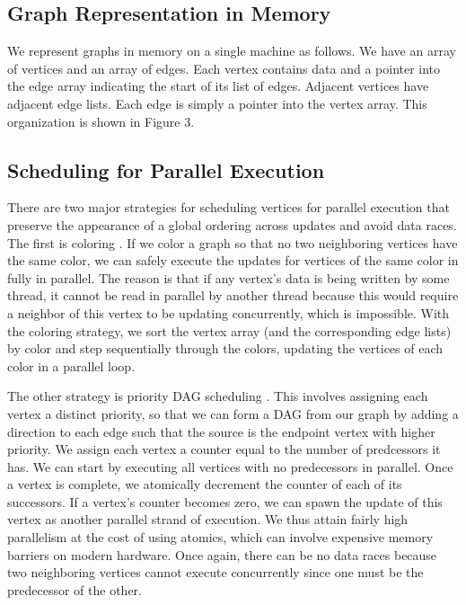 \subsection{Graph Representation in Memory}
We represent graphs in memory on a single machine as follows. We have an array of vertices and an array of edges. Each vertex contains data and a pointer into the edge array indicating the start of its list of edges. Adjacent vertices have adjacent edge lists. Each edge is simply a pointer into the vertex array. This organization is shown in Figure 3.

\subsection{Scheduling for Parallel Execution}
There are two major strategies for scheduling vertices for parallel execution that preserve the appearance of a global ordering across updates and avoid data races. The first is coloring \cite{KalerHaSc14}. If we color a graph so that no two neighboring vertices have the same color, we can safely execute the updates for vertices of the same color in fully in parallel. The reason is that if any vertex's data is being written by some thread, it cannot be read in parallel by another thread because this would require a neighbor of this vertex to be updating concurrently, which is impossible. With the coloring strategy, we sort the vertex array (and the corresponding edge lists) by color and step sequentially through the colors, updating the vertices of each color in a parallel loop.

The other strategy is priority DAG scheduling \cite{JonesPl93}. This involves assigning each vertex a distinct priority, so that we can form a DAG from our graph by adding a direction to each edge such that the source is the endpoint vertex with higher priority. We assign each vertex a counter equal to the number of predcessors it has. We can start by executing all vertices with no predecessors in parallel. Once a vertex is complete, we atomically decrement the counter of each of its successors. If a vertex's counter becomes zero, we can spawn the update of this vertex as another parallel strand of execution. We thus attain fairly high parallelism at the cost of using atomics, which can involve expensive memory barriers on modern hardware. Once again, there can be no data races because two neighboring vertices cannot execute concurrently since one must be the predecessor of the other.


